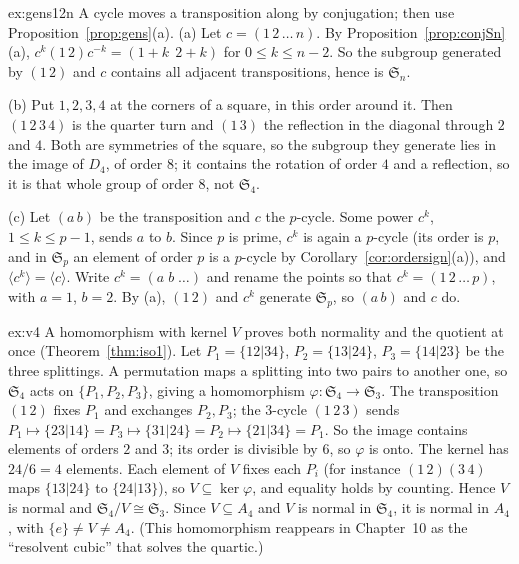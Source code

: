 \begin{solution}{ex:gens12n}
\idea A cycle moves a transposition along by conjugation; then use Proposition~\ref{prop:gens}(a).
\writeup (a) Let $c=(1\,2\,\dots\,n)$. By Proposition~\ref{prop:conjSn}(a), $c^k(1\,2)c^{-k}=(1+k\;\,2+k)$ for $0\le k\le n-2$. So the subgroup generated by $(1\,2)$ and $c$ contains all adjacent transpositions, hence is $\mathfrak S_n$.

(b) Put $1,2,3,4$ at the corners of a square, in this order around it. Then $(1\,2\,3\,4)$ is the quarter turn and $(1\,3)$ the reflection in the diagonal through $2$ and $4$. Both are symmetries of the square, so the subgroup they generate lies in the image of $D_4$, of order $8$; it contains the rotation of order $4$ and a reflection, so it is that whole group of order $8$, not $\mathfrak S_4$.

(c) Let $(a\,b)$ be the transposition and $c$ the $p$-cycle. Some power $c^k$, $1\le k\le p-1$, sends $a$ to $b$. Since $p$ is prime, $c^k$ is again a $p$-cycle (its order is $p$, and in $\mathfrak S_p$ an element of order $p$ is a $p$-cycle by Corollary~\ref{cor:ordersign}(a)), and $\langle c^k\rangle=\langle c\rangle$. Write $c^k=(a\;b\;\dots)$ and rename the points so that $c^k=(1\,2\,\dots\,p)$, with $a=1$, $b=2$. By (a), $(1\,2)$ and $c^k$ generate $\mathfrak S_p$, so $(a\,b)$ and $c$ do.
\end{solution}

\begin{solution}{ex:v4}
\idea A homomorphism with kernel $V$ proves both normality and the quotient at once (Theorem~\ref{thm:iso1}).
\writeup Let $P_1=\{12|34\}$, $P_2=\{13|24\}$, $P_3=\{14|23\}$ be the three splittings. A permutation maps a splitting into two pairs to another one, so $\mathfrak S_4$ acts on $\{P_1,P_2,P_3\}$, giving a homomorphism $\varphi:\mathfrak S_4\to\mathfrak S_3$. The transposition $(1\,2)$ fixes $P_1$ and exchanges $P_2,P_3$; the $3$-cycle $(1\,2\,3)$ sends $P_1\mapsto\{23|14\}=P_3\mapsto\{31|24\}=P_2\mapsto\{21|34\}=P_1$. So the image contains elements of orders $2$ and $3$; its order is divisible by $6$, so $\varphi$ is onto. The kernel has $24/6=4$ elements. Each element of $V$ fixes each $P_i$ (for instance $(1\,2)(3\,4)$ maps $\{13|24\}$ to $\{24|13\}$), so $V\subseteq\ker\varphi$, and equality holds by counting. Hence $V$ is normal and $\mathfrak S_4/V\cong\mathfrak S_3$. Since $V\subseteq A_4$ and $V$ is normal in $\mathfrak S_4$, it is normal in $A_4$, with $\{e\}\ne V\ne A_4$. (This homomorphism reappears in Chapter~10 as the ``resolvent cubic'' that solves the quartic.)
\end{solution}

